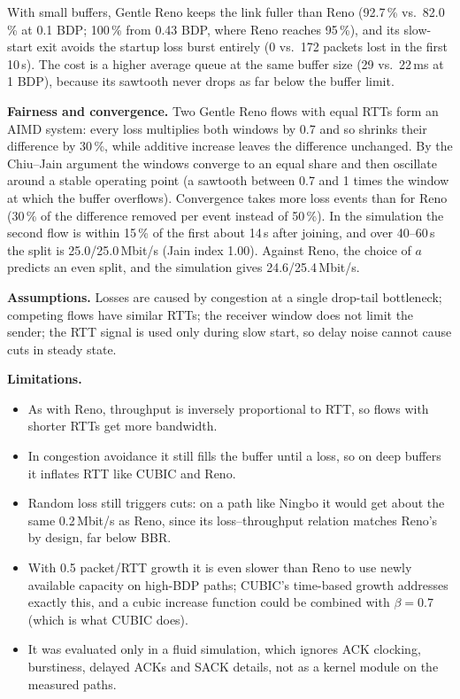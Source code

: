 \documentclass[10pt]{article}
\begin{document}
With small buffers, Gentle Reno keeps the link fuller than Reno (92.7\,\% vs.\ 82.0\,\% at 0.1 BDP; 100\,\% from 0.43 BDP, where Reno reaches 95\,\%), and its slow-start exit avoids the startup loss burst entirely (0 vs.\ 172 packets lost in the first 10\,s). The cost is a higher average queue at the same buffer size (29 vs.\ 22\,ms at 1 BDP), because its sawtooth never drops as far below the buffer limit.

\textbf{Fairness and convergence.} Two Gentle Reno flows with equal RTTs form an AIMD system: every loss multiplies both windows by 0.7 and so shrinks their difference by 30\,\%, while additive increase leaves the difference unchanged. By the Chiu--Jain argument the windows converge to an equal share and then oscillate around a stable operating point (a sawtooth between 0.7 and 1 times the window at which the buffer overflows). Convergence takes more loss events than for Reno (30\,\% of the difference removed per event instead of 50\,\%). In the simulation the second flow is within 15\,\% of the first about 14\,s after joining, and over 40--60\,s the split is 25.0/25.0\,Mbit/s (Jain index 1.00). Against Reno, the choice of $a$ predicts an even split, and the simulation gives 24.6/25.4\,Mbit/s.

\textbf{Assumptions.} Losses are caused by congestion at a single drop-tail bottleneck; competing flows have similar RTTs; the receiver window does not limit the sender; the RTT signal is used only during slow start, so delay noise cannot cause cuts in steady state.

\textbf{Limitations.}
\begin{itemize}
\item As with Reno, throughput is inversely proportional to RTT, so flows with shorter RTTs get more bandwidth.
\item In congestion avoidance it still fills the buffer until a loss, so on deep buffers it inflates RTT like CUBIC and Reno.
\item Random loss still triggers cuts: on a path like Ningbo it would get about the same 0.2\,Mbit/s as Reno, since its loss--throughput relation matches Reno's by design, far below BBR.
\item With 0.5 packet/RTT growth it is even slower than Reno to use newly available capacity on high-BDP paths; CUBIC's time-based growth addresses exactly this, and a cubic increase function could be combined with $\beta = 0.7$ (which is what CUBIC does).
\item It was evaluated only in a fluid simulation, which ignores ACK clocking, burstiness, delayed ACKs and SACK details, not as a kernel module on the measured paths.
\end{itemize}
\end{document}
